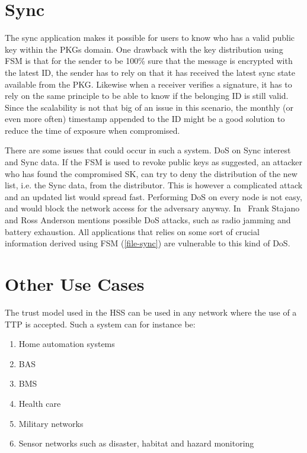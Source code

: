 \section{Sync}
The sync application makes it possible for users to know who has a valid public key within the \gls{PKG}s domain.
One drawback with the key distribution using \gls{FSM} is that for the sender to be 100\% sure that the message is encrypted with the latest \gls{ID}, the sender has to rely on that it has received the latest sync state available from the \gls{PKG}.
Likewise when a \gls{receiver} verifies a signature, it has to rely on the same principle to be able to know if the belonging \gls{ID} is still valid.
Since the scalability is not that big of an issue in this scenario, the monthly (or even more often) timestamp appended to the \gls{ID} might be a good solution to reduce the time of exposure when compromised.

There are some issues that could occur in such a system. 
\gls{DoS} on Sync \gls{interest} and Sync \gls{data}. 
If the \gls{FSM} is used to revoke public keys as suggested, an attacker who has found the compromised \gls{SK}, can try to deny the distribution of the new list, i.e. the Sync \gls{data}, from the distributor. 
This is however a complicated attack and an updated list would spread fast.
Performing \gls{DoS} on every node is not easy, and would block the network access for the adversary anyway.
In~\cite{DBLP:conf/spw/StajanoA99} Frank Stajano and Ross Anderson mentions possible \gls{DoS} attacks, such as radio jamming and battery exhaustion. 
All applications that relies on some sort of crucial information derived using \gls{FSM} (\autoref{file-sync}) are vulnerable to this kind of \gls{DoS}.

\section{Other Use Cases}
The trust model used in the \gls{HSS} can be used in any network where the use of a \gls{TTP} is accepted. 
Such a system can for instance be:
\begin{enumerate}
	\item Home automation systems
	\item \gls{BAS}
	\item \gls{BMS}
	\item Health care
	\item Military networks
	\item Sensor networks such as disaster, habitat and hazard monitoring
\end{enumerate}


